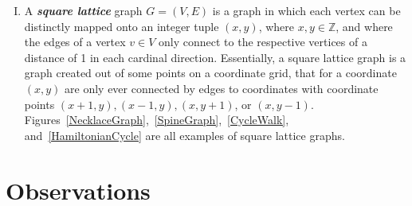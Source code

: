 \documentclass[a4paper,12pt]{article}
\begin{document}
\begin{enumerate}[I.]
\item A \textit{\textbf{square lattice}} graph $G=(V,E)$ is a graph in which each vertex can be distinctly mapped onto an integer tuple $(x,y)$, where $x,y\in \mathbb{Z}$, and where the edges of a vertex $v\in V$ only connect to the respective vertices of a distance of 1 in each cardinal direction. Essentially, a square lattice graph is a graph created out of some points on a coordinate grid, that for a coordinate $(x,y)$ are only ever connected by edges to coordinates with coordinate points $(x+1,y), (x-1,y), (x,y+1)$, or $(x,y-1)$. Figures~\ref{NecklaceGraph},~\ref{SpineGraph},~\ref{CycleWalk}, and~\ref{HamiltonianCycle} are all examples of square lattice graphs.

\end{enumerate}

\section{Observations}
\end{document}

